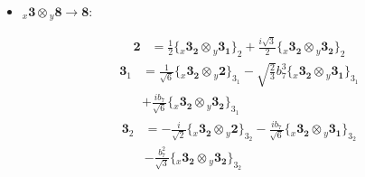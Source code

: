 \documentclass[english]{article}
\newcommand{\rep}[1]{\mathbf{#1}}
\newcommand{\repx}[2]{{}_{#2}\mathbf{#1}}
\newcommand{\tsprodx}[2]{\repx{#1}{x}\otimes\repx{#2}{y}}
\newcommand{\subcgs}[3]{\big\{ \tsprodx{#1}{#2}\big\}^{}_{#3}}
\begin{document}
\begin{itemize}
\begin{fleqn}
\end{fleqn}
\item $\tsprodx{3}{8}\to\rep{8}$:
\begin{fleqn}
\begin{align*}
\rep{2} & = \frac{1}{2}\subcgs{3_{2}}{3_{1}}{2}+\frac{i \sqrt{3}}{2}\subcgs{3_{2}}{3_{2}}{2}
\end{align*}
\begin{align*}
\rep{3}_{1} & = \frac{1}{\sqrt{6}}\subcgs{3_{2}}{2}{3_{1}}-\sqrt{\frac{2}{3}} b_7^3\subcgs{3_{2}}{3_{1}}{3_{1}} \\ 
 & +\frac{i b_7}{\sqrt{6}}\subcgs{3_{2}}{3_{2}}{3_{1}}
\end{align*}
\begin{align*}
\rep{3}_{2} & = -\frac{i}{\sqrt{2}}\subcgs{3_{2}}{2}{3_{2}}-\frac{i b_7}{\sqrt{6}}\subcgs{3_{2}}{3_{1}}{3_{2}} \\ 
 & -\frac{b_7^2}{\sqrt{3}}\subcgs{3_{2}}{3_{2}}{3_{2}}
\end{align*}
\end{fleqn}
\end{itemize}
\end{document}
